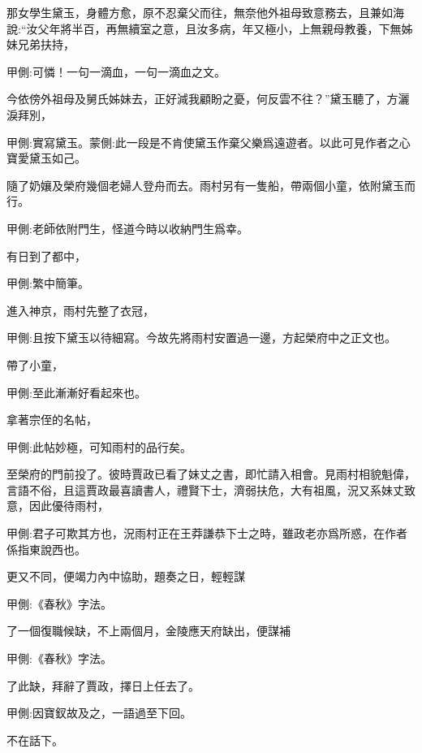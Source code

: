 \begin{parag}
    那女學生黛玉，身體方愈，原不忍棄父而往，無奈他外祖母致意務去，且兼如海說:“汝父年將半百，再無續室之意，且汝多病，年又極小，上無親母教養，下無姊妹兄弟扶持，\begin{note}甲側:可憐！一句一滴血，一句一滴血之文。\end{note}今依傍外祖母及舅氏姊妹去，正好減我顧盼之憂，何反雲不往？”黛玉聽了，方灑淚拜別，\begin{note}甲側:實寫黛玉。蒙側:此一段是不肯使黛玉作棄父樂爲遠遊者。以此可見作者之心寶愛黛玉如己。\end{note}隨了奶孃及榮府幾個老婦人登舟而去。雨村另有一隻船，帶兩個小童，依附黛玉而行。\begin{note}甲側:老師依附門生，怪道今時以收納門生爲幸。\end{note}
\end{parag}


\begin{parag}
    有日到了都中，\begin{note}甲側:繁中簡筆。\end{note}進入神京，雨村先整了衣冠，\begin{note}甲側:且按下黛玉以待細寫。今故先將雨村安置過一邊，方起榮府中之正文也。\end{note}帶了小童，\begin{note}甲側:至此漸漸好看起來也。\end{note}拿著宗侄的名帖，\begin{note}甲側:此帖妙極，可知雨村的品行矣。\end{note}至榮府的門前投了。彼時賈政已看了妹丈之書，即忙請入相會。見雨村相貌魁偉，言語不俗，且這賈政最喜讀書人，禮賢下士，濟弱扶危，大有祖風，況又系妹丈致意，因此優待雨村，\begin{note}甲側:君子可欺其方也，況雨村正在王莽謙恭下士之時，雖政老亦爲所惑，在作者係指東說西也。\end{note}更又不同，便竭力內中協助，題奏之日，輕輕謀\begin{note}甲側:《春秋》字法。\end{note}了一個復職候缺，不上兩個月，金陵應天府缺出，便謀補\begin{note}甲側:《春秋》字法。\end{note}了此缺，拜辭了賈政，擇日上任去了。\begin{note}甲側:因寶釵故及之，一語過至下回。\end{note}不在話下。
\end{parag}


